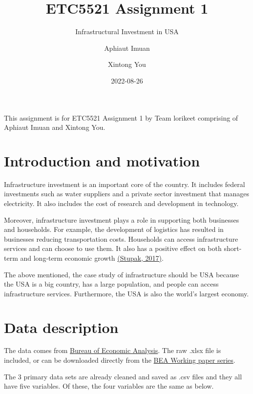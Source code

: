 \documentclass[
]{article}
\title{ETC5521 Assignment 1}
\subtitle{Infrastructural Investment in USA}
\author{Aphiaut Imuan \and Xintong You}
\date{2022-08-26}
\begin{document}
\maketitle

{
\setcounter{tocdepth}{2}
\tableofcontents
}
{This assignment is for ETC5521 Assignment 1 by Team lorikeet comprising of Aphiaut Imuan and Xintong You.}

\hypertarget{introduction-and-motivation}{%
\section{Introduction and motivation}\label{introduction-and-motivation}}

Infrastructure investment is an important core of the country. It includes federal investments such as water suppliers and a private sector investment that manages electricity. It also includes the cost of research and development in technology.

Moreover, infrastructure investment plays a role in supporting both businesses and households. For example, the development of logistics has resulted in businesses reducing transportation costs. Households can access infrastructure services and can choose to use them. It also has a positive effect on both short-term and long-term economic growth \href{https://ecommons.cornell.edu/bitstream/handle/1813/78289/CRS_Economic_Impact_of_Infrastructure_Investment_0717.pdf?sequence=1\&isAllowed=y}{(Stupak, 2017)}.

The above mentioned, the case study of infrastructure should be USA because the USA is a big country, has a large population, and people can access infrastructure services. Furthermore, the USA is also the world's largest economy.

\hypertarget{data-description}{%
\section{Data description}\label{data-description}}

The data comes from \href{https://www.bea.gov/system/files/papers/BEA-WP2020-12.pdf}{Bureau of Economic Analysis}. The raw .xlsx file is included, or can be downloaded directly from the \href{https://www.bea.gov/system/files/2021-01/infrastructure-data-may-2020.xlsx}{BEA Working paper series}.

The 3 primary data sets are already cleaned and saved as .csv files and they all have five variables. Of these, the four variables are the same as below.
\end{document}
